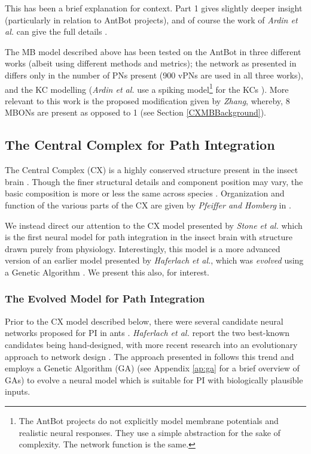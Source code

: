 \documentclass[a4paper,11pt,twoside,openright]{article}
\begin{document}
This has been a brief explanation for context. Part 1 gives slightly deeper
insight \cite{Mitchell2018} (particularly in relation to AntBot projects), and of
course the work of \textit{Ardin et al.} can give the full details
\cite{Ardin2016}.
\newline
\par

The MB model described above has been tested on the AntBot in three
different works (albeit using different methods and metrics); the
network as presented in \cite{Eberding2016, Zhang2017, Mitchell2018}
differs only in the number of PNs present (900 vPNs are used in all
three works), and the KC modelling (\textit{Ardin et al.} use a
spiking model\footnote{The AntBot projects do not explicitly model
  membrane potentials and realistic neural responses.  They use a
  simple abstraction for the sake of complexity. The network function
  is the same.} for the KCs \cite{Ardin2016}). More
relevant to this work is the proposed modification given by
\textit{Zhang}, whereby, 8 MBONs are present as opposed to 1 (see
Section \ref{CXMBBackground}).
\newline
\par

\subsection{ The Central Complex for Path Integration } \label{CXBackground}
The Central Complex (CX) is a highly conserved structure present in the insect
brain \cite{Pfeiffer2014, Stone2017}. Though the finer structural details and
component position may vary, the basic composition is more or less the same
across species \cite{Pfeiffer2014}. Organization and function of the
various parts of the CX are given by \textit{Pfeiffer and Homberg} in
\cite{Pfeiffer2014}.
\newline
\par

We instead direct our attention to the CX model presented by
\textit{Stone et al.}  which is the first neural model for path
integration in the insect brain with structure drawn purely from
physiology. Interestingly, this model is a more advanced version of an
earlier model presented by \textit{Haferlach et al.}, which was
\textit{evolved} using a Genetic Algorithm \cite{Haferlach2007}. We
present this also, for interest.

\subsubsection{The Evolved Model for Path Integration}
Prior to the CX model described below, there were several candidate neural
networks proposed for PI in ants \cite{Haferlach2007}. \textit{Haferlach et al.}
report the
two best-known candidates being hand-designed, with more recent research
into an evolutionary approach to network design \cite{Haferlach2007}. The
approach presented in \cite{Haferlach2007} follows this trend and employs
a Genetic Algorithm (GA) (see Appendix \ref{ap:ga} for a brief
overview of GAs) to
evolve a neural model which is suitable for PI with biologically plausible
inputs.
\newline
\par
\end{document}
